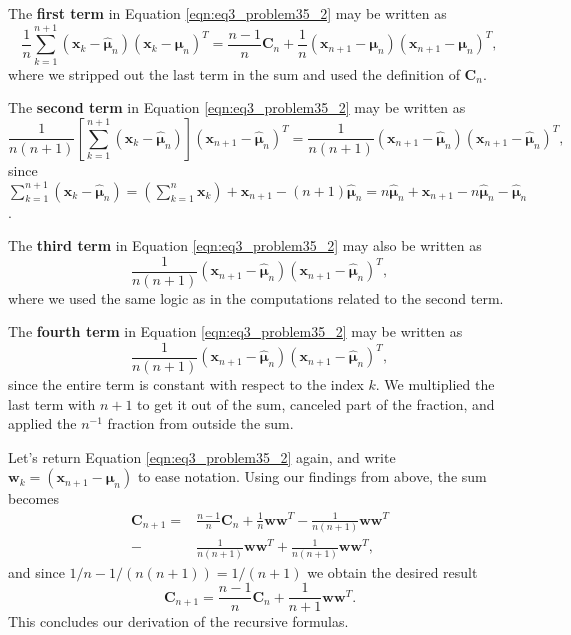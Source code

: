 \documentclass[12pt, a4paper]{article}
\newcommand{\vect}[1]{\bm{#1}}
\begin{document}
\begin{easylist}[enumerate]
	The \textbf{first term} in Equation \eqref{eqn:eq3_problem35_2} may be written as
	\begin{equation*}
	\frac{1}{n} \sum_{k=1}^{n+1}  \left( \vect{x}_k  - \hat{\vect{\mu}}_n \right)\left( \vect{x}_k  - \hat{\vect{\mu}}_n \right)^T = \frac{n-1}{n} \vect{C}_n  
	+ \frac{1}{n} \left( \vect{x}_{n+1} - \vect{\mu}_n \right) 
	\left( \vect{x}_{n+1} - \vect{\mu}_n \right)^T,
	\end{equation*}
	where we stripped out the last term in the sum and used the definition of $\vect{C}_n$.
	
	
	The \textbf{second term} in Equation \eqref{eqn:eq3_problem35_2} may be written as
	\begin{equation*}
	\frac{1}{n(n+1)} \left[ \sum_{k=1}^{n+1}  \left( \vect{x}_{k}  - \hat{\vect{\mu}}_n \right)\right]\left( \vect{x}_{n+1} - \hat{\vect{\mu}}_n \right)^T
	= 
	\frac{1}{n(n+1)}  
	\left( \vect{x}_{n+1} - \hat{\vect{\mu}}_n \right)
	\left( \vect{x}_{n+1} - \hat{\vect{\mu}}_n \right)^T,
	\end{equation*}
	since $\sum_{k=1}^{n+1}  \left( \vect{x}_{k}  - \hat{\vect{\mu}}_n \right)
	= \left( \sum_{k=1}^{n} \vect{x}_{k} \right) + \vect{x}_{n+1} - (n+1)\hat{\vect{\mu}}_n = n\hat{\vect{\mu}}_n + \vect{x}_{n+1} - n\hat{\vect{\mu}}_n - \hat{\vect{\mu}}_n$.
	
	The \textbf{third term} in Equation \eqref{eqn:eq3_problem35_2} may also be written as
	\begin{equation*}
	\frac{1}{n(n+1)}  
	\left( \vect{x}_{n+1} - \hat{\vect{\mu}}_n \right)
	\left( \vect{x}_{n+1} - \hat{\vect{\mu}}_n \right)^T,
	\end{equation*}
	where we used the same logic as in the computations related to the second term.
	
	The \textbf{fourth term} in Equation \eqref{eqn:eq3_problem35_2} may be written as
	\begin{equation*}
	\frac{1}{n(n+1)}  
	\left( \vect{x}_{n+1} - \hat{\vect{\mu}}_n \right)
	\left( \vect{x}_{n+1} - \hat{\vect{\mu}}_n \right)^T,
	\end{equation*}
	since the entire term is constant with respect to the index $k$.
	We multiplied the last term with $n+1$ to get it out of the sum, canceled part of the fraction, and applied the $n^{-1}$ fraction from outside the sum.
	
	Let's return Equation \eqref{eqn:eq3_problem35_2} again, and write $\vect{w}_k = \left( \vect{x}_{n+1} - \hat{\vect{\mu}}_n \right)$ to ease notation.
	Using our findings from above, the sum becomes
	\begin{align*}
	\vect{C}_{n+1} = & \frac{n-1}{n} \vect{C}_n +  \frac{1}{n} \vect{w} \vect{w}^T -  \frac{1}{n(n+1)} \vect{w} \vect{w}^T \\
	- &  \frac{1}{n(n+1)} \vect{w} \vect{w}^T + \frac{1}{n(n+1)} \vect{w} \vect{w}^T,
	\end{align*}
	and since $1/n - 1/(n (n+1)) = 1 / ( n + 1 )$ we obtain the desired result
	\begin{equation*}
	\vect{C}_{n+1} = \frac{n-1}{n} \vect{C}_n + \frac{1}{n+1} \vect{w} \vect{w}^T.
	\end{equation*}
	This concludes our derivation of the recursive formulas.
	

\end{easylist}
\end{document}
